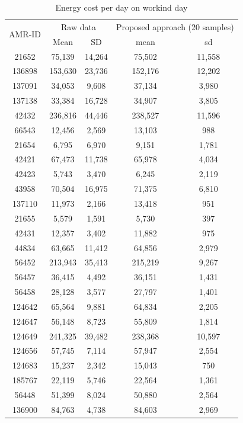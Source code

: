\documentclass[conference]{IEEEtran}
\begin{document}
\begin{table}[]
  \caption{Energy cost per day on workind day}
  \begin{center}
  \begin{tabular}{ccccc}
  \hline
  \multirow{2}{*}{AMR-ID} & \multicolumn{2}{c}{Raw data}               & \multicolumn{2}{c}{Proposed approach (20 samples)}\\
                          & \multicolumn{1}{c}{Mean} & \multicolumn{1}{c}{SD} & \multicolumn{1}{c}{mean}  & \multicolumn{1}{c}{sd} \\
  \hline
  21652 & 75,139 & 14,264 & 75,502 & 11,558 \\
136898 & 153,630 & 23,736 & 152,176 & 12,202 \\
137091 & 34,053 & 9,608 & 37,134 & 3,980 \\
137138 & 33,384 & 16,728 & 34,907 & 3,805 \\
42432 & 236,816 & 44,446 & 238,527 & 11,596 \\
66543 & 12,456 & 2,569 & 13,103 & 988 \\
21654 & 6,795 & 6,970 & 9,151 & 1,781 \\
42421 & 67,473 & 11,738 & 65,978 & 4,034 \\
42423 & 5,743 & 3,470 & 6,245 & 2,119 \\
43958 & 70,504 & 16,975 & 71,375 & 6,810 \\
137110 & 11,973 & 2,166 & 13,418 & 951 \\
21655 & 5,579 & 1,591 & 5,730 & 397 \\
42431 & 12,357 & 3,402 & 11,882 & 975 \\
44834 & 63,665 & 11,412 & 64,856 & 2,979 \\
56452 & 213,943 & 35,413 & 215,219 & 9,267 \\
56457 & 36,415 & 4,492 & 36,151 & 1,431 \\
56458 & 28,128 & 3,577 & 27,797 & 1,401 \\
124642 & 65,564 & 9,881 & 64,834 & 2,205 \\
124647 & 56,148 & 8,723 & 55,809 & 1,814 \\
124649 & 241,325 & 39,482 & 238,368 & 10,597 \\
124656 & 57,745 & 7,114 & 57,947 & 2,554 \\
124683 & 15,237 & 2,342 & 15,043 & 750 \\
185767 & 22,119 & 5,746 & 22,564 & 1,361 \\
56448 & 51,399 & 8,024 & 50,880 & 2,564 \\
136900 & 84,763 & 4,738 & 84,603 & 2,969 \\

\end{tabular}
\end{center}
\end{table}
\end{document}
